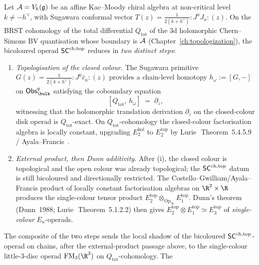 \begin{theorem}
\label{thm:heptagon-collapse}%
%
%
%

Let $\mathcal{A}=V_k(\mathfrak{g})$ be an affine Kac--Moody chiral algebra at
non-critical level $k\neq -h^{\vee}$, with Sugawara conformal
vector $T(z)=\tfrac{1}{2(k+h^{\vee})}:\!J^aJ_a\!:(z)$. On the
BRST cohomology of the total differential $Q_{\mathrm{tot}}$ of the
$3$d holomorphic Chern--Simons BV quantisation whose boundary is
$\mathcal{A}$ (Chapter~\ref{ch:topologization}), the bicoloured operad
$\mathsf{SC}^{\mathrm{ch},\mathrm{top}}$ reduces in \emph{two distinct steps}:
\begin{enumerate}[label=\textup{(\roman*)}]
 \item \emph{Topologisation of the closed colour.} The Sugawara
 primitive $G(z)=\tfrac{1}{2(k+h^{\vee})}{:}J^a\bar c_a{:}(z)$
 provides a chain-level homotopy $h_\omega :=[G,-]$ on
 $\Obs^q_\bulk$ satisfying the coboundary equation
 \begin{equation}\label{eq:h-omega-coboundary-km}
 [Q_{\mathrm{tot}},\,h_\omega]\;=\;\partial_z,
 \end{equation}
 witnessing that the holomorphic translation derivation $\partial_z$
 on the closed-colour disk operad is $Q_{\mathrm{tot}}$-exact. On
 $Q_{\mathrm{tot}}$-cohomology the closed-colour factorisation
 algebra is locally constant, upgrading $E_2^{\mathrm{hol}}$ to
 $E_2^{\mathrm{top}}$ by Lurie~\cite{HA}\,Theorem~5.4.5.9 /
 Ayala--Francis~\cite{AF15}.
 \item \emph{External product, then Dunn additivity.} After
 (i), the closed colour is topological and the open colour was
 already topological; the $\mathsf{SC}^{\mathrm{ch},\mathrm{top}}$ datum is still bicoloured and
 directionally restricted. The Costello--Gwilliam/Ayala--Francis
 product of locally constant factorisation algebras on
 $\R^2\times\R$ produces the single-colour tensor product
 $E_2^{\mathrm{top}}\otimes_{\mathrm{Op}_\infty}
 E_1^{\mathrm{top}}$. Dunn's theorem
 (Dunn~1988; Lurie~\cite{HA}\,Theorem~5.1.2.2) then gives
 $E_2^{\mathrm{top}}\otimes E_1^{\mathrm{top}}\simeq
 E_3^{\mathrm{top}}$ of \emph{single-colour}
 $E_n$-operads.
\end{enumerate}
The composite of the two steps sends the local shadow of the
bicoloured $\mathsf{SC}^{\mathrm{ch},\mathrm{top}}$-operad on chains, after the external-product
passage above, to the single-colour little-$3$-disc operad
$\FM_3(\R^3)$ on $Q_{\mathrm{tot}}$-cohomology. The

\end{theorem}
